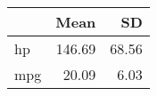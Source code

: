 \begin{table}
\centering
\begin{tabular}[t]{lrr}
\toprule
  & Mean & SD\\
\midrule
hp & \num{146.69} & \num{68.56}\\
mpg & \num{20.09} & \num{6.03}\\
\bottomrule
\end{tabular}
\end{table}
